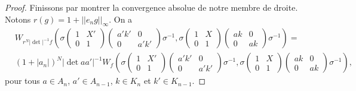 \documentclass{amsart}
\begin{document}
\begin{proof}
Finissons par montrer la convergence absolue de notre membre de droite. Notons $r(g) = 1 + ||e_ng||_\infty$. On a
\begin{equation}
\begin{split}
& W_{r^N |\det|^{-1} f}\left(\sigma \begin{pmatrix}
1 & X' \\
0 & 1
\end{pmatrix} \begin{pmatrix}
a'k' & 0 \\
0 & a'k'
\end{pmatrix} \sigma^{-1}, \sigma \begin{pmatrix}
1 & X \\
0 & 1
\end{pmatrix} \begin{pmatrix}
ak & 0 \\
0 & ak
\end{pmatrix} \sigma^{-1}\right) = \\
& (1+|a_n|)^N |\det aa'|^{-1} W_f\left(\sigma \begin{pmatrix}
1 & X' \\
0 & 1
\end{pmatrix} \begin{pmatrix}
a'k' & 0 \\
0 & a'k'
\end{pmatrix} \sigma^{-1}, \sigma \begin{pmatrix}
1 & X \\
0 & 1
\end{pmatrix} \begin{pmatrix}
ak & 0 \\
0 & ak
\end{pmatrix} \sigma^{-1}\right),
\end{split}
\end{equation}
pour tous $a \in A_n$, $a' \in A_{n-1}$, $k \in K_n$ et  $k' \in K_{n-1}$.


\end{proof}
\end{document}
